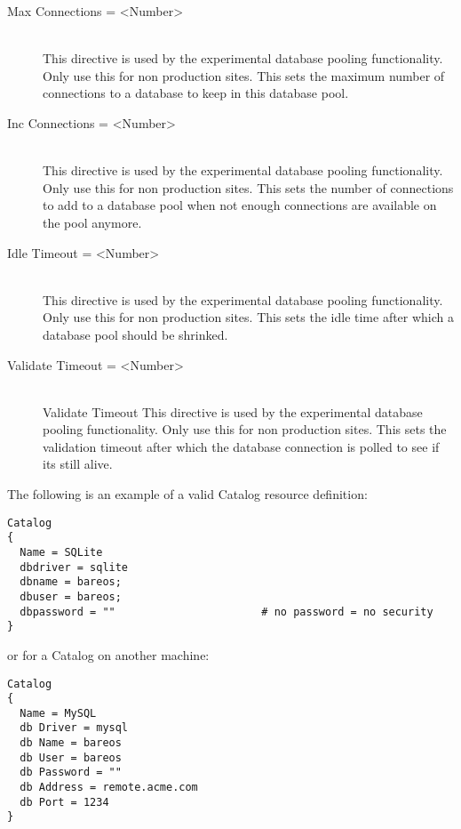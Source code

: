 \begin{description}
\item [Max Connections = {\textless}Number{\textgreater}] \hfill \\
This directive is used by the experimental database pooling functionality. Only use
this for non production sites. This sets the maximum number of connections to a
database to keep in this database pool.

\item [Inc Connections = {\textless}Number{\textgreater}] \hfill \\
\index[dir]{}
This directive is used by the experimental database pooling functionality. Only use
this for non production sites. This sets the number of connections to add to a
database pool when not enough connections are available on the pool anymore.

\item [Idle Timeout = {\textless}Number{\textgreater}] \hfill \\
This directive is used by the experimental database pooling functionality. Only use
this for non production sites. This sets the idle time after which a database pool
should be shrinked.

\item [Validate Timeout = {\textless}Number{\textgreater}] \hfill \\
\index[dir]Validate Timeout{}
This directive is used by the experimental database pooling functionality. Only use
this for non production sites. This sets the validation timeout after which the
database connection is polled to see if its still alive.
\end{description}

The following is an example of a valid Catalog resource definition:

\footnotesize
\begin{verbatim}
Catalog
{
  Name = SQLite
  dbdriver = sqlite
  dbname = bareos;
  dbuser = bareos;
  dbpassword = ""                       # no password = no security
}
\end{verbatim}
\normalsize

or for a Catalog on another machine:

\footnotesize
\begin{verbatim}
Catalog
{
  Name = MySQL
  db Driver = mysql
  db Name = bareos
  db User = bareos
  db Password = ""
  db Address = remote.acme.com
  db Port = 1234
}
\end{verbatim}
\normalsize

